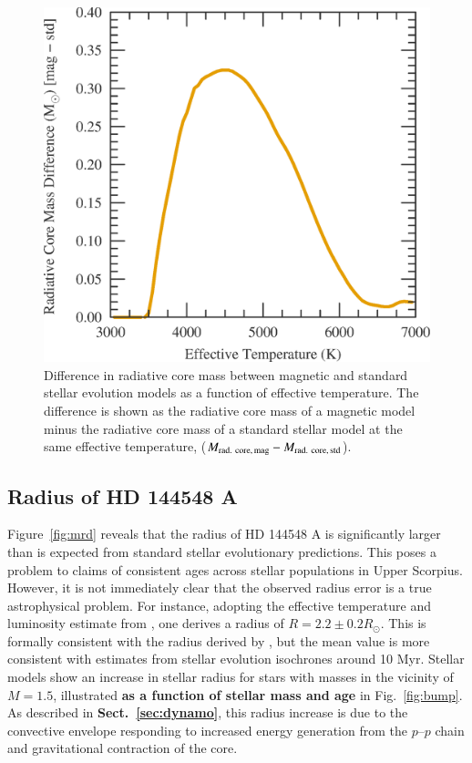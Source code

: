 \documentclass{aa}
\begin{document}
\begin{figure}[t]
    \centering
    \includegraphics[width=0.95\linewidth]{radiative_core_mass_difference.eps}
    \caption{Difference in radiative core mass between magnetic and standard stellar evolution models as a function of effective temperature. The difference is shown as the radiative core mass of a magnetic model minus the radiative core mass of a standard stellar model at the same effective temperature, ($M_{\rm rad.\ core,\, mag} - M_{\rm rad.\ core,\, std}$).}
    \label{fig:delta_mass}
\end{figure}

\subsection{Radius of HD 144548 A}
\label{sec:radius}
Figure~\ref{fig:mrd} reveals that the radius of HD 144548 A is significantly larger than is expected from standard stellar evolutionary predictions. This poses a problem to claims of consistent ages across stellar populations in Upper Scorpius. However, it is not immediately clear that the observed radius error is a true astrophysical problem. For instance, adopting the effective temperature and luminosity estimate from \citet{Pecaut2012}, one derives a radius of $R = 2.2 \pm 0.2 R_{\odot}$. This is formally consistent with the radius derived by \citep{Alonso2015}, but the mean value is more consistent with estimates from stellar evolution isochrones around 10 Myr. Stellar models show an increase in stellar radius for stars with masses in the vicinity of $M = 1.5$\msun, illustrated {\bf as a function of stellar mass and age} in Fig.\ \ref{fig:bump}. As described in {\bf Sect.\ \ref{sec:dynamo}}, this radius increase is due to the convective envelope responding to increased energy generation from the $p$--$p$ chain and gravitational contraction of the core.
\end{document}
